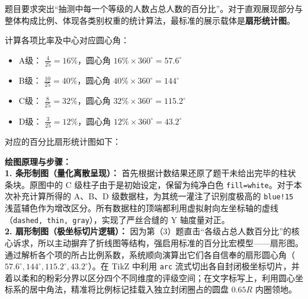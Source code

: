 题目要求突出“抽测中每一个等级的人数占总人数的百分比”。对于直观展现部分与整体构成比例、体现各类别权重的统计算法，最标准的展示载体是\textbf{扇形统计图}。

计算各项比率及中心对应圆心角：
\begin{itemize}
    \item A级： $\frac{4}{25} = 16\%$，圆心角 $16\% \times 360^\circ = 57.6^\circ$
    \item B级： $\frac{10}{25} = 40\%$，圆心角 $40\% \times 360^\circ = 144^\circ$
    \item C级： $\frac{8}{25} = 32\%$，圆心角 $32\% \times 360^\circ = 115.2^\circ$
    \item D级： $\frac{3}{25} = 12\%$，圆心角 $12\% \times 360^\circ = 43.2^\circ$
\end{itemize}

对应的百分比扇形统计图如下：
\begin{center}
\end{center}

\vspace{0.4cm}
{\small\color{blue!70!black}
\textbf{绘图原理与步骤：}\\
\textbf{1. 条形制图（量化离散呈现）：} 首先根据计数结果还原了题干未给出完毕的柱状条块。原图中的 C 级柱子由于是初始设定，保留为纯净白色 \texttt{fill=white}。对于本次补充计算所得的 A$、$B$、$D 级数据柱，为其统一灌注了识别度极高的 \texttt{blue!15} 浅蓝辅色作为增改区分。所有数据柱的顶端都利用虚拟射向左坐标轴的虚线（\texttt{dashed, thin, gray}），实现了严丝合缝的 Y 轴度量对正。\\
\textbf{2. 扇形制图（极坐标切片逻辑）：} 因为第（3）题直击“各级占总人数百分比”的核心诉求，所以主动摒弃了折线图等结构，强启用标准的百分比宏模型——扇形图。通过解析各个项的所占比例系数，系统顺向演算出它们各自信奉的扇形圆心角（$57.6^\circ, 144^\circ, 115.2^\circ, 43.2^\circ$）。在 TikZ 中利用 \texttt{arc} 流式切出各自封闭极坐标切片，并着以柔和的粉彩分界以区分四个不同维度的评级空间；在文字标写上，利用圆心坐标系的居中角法，精准将比例标记挂载入独立封闭圈占的圆盘 $0.65R$ 内圈领地。
}

